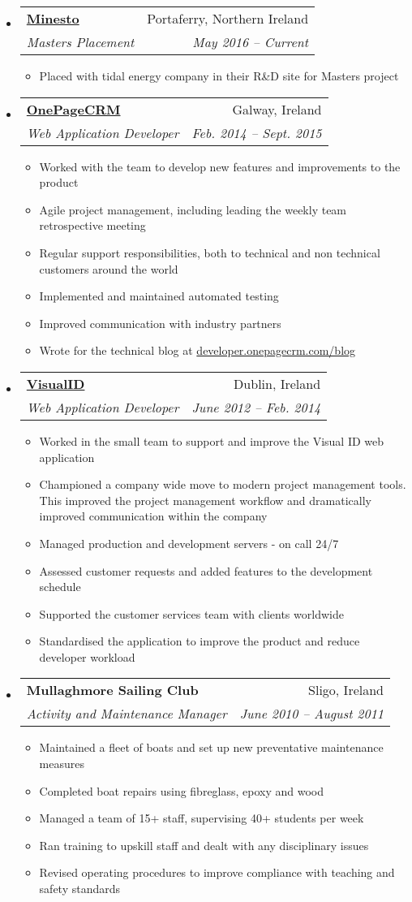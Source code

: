 \documentclass[letterpaper,11pt]{article}
\makeatletter
\newcommand{\resitem}[1]{\item #1 \vspace{-2pt}}
\newcommand{\ressubheading}[4]{
\begin{tabular*}{6.5in}{l@{\extracolsep{\fill}}r}
		\textbf{#1} & #2 \\
		\textit{#3} & \textit{#4} \\
\end{tabular*}\vspace{-6pt}}
\makeatother
\begin{document}
	\begin{itemize}
    \item 
      \ressubheading{\href{http://www.minesto.com}{Minesto}}{Portaferry, Northern Ireland}
        {Masters Placement}{May 2016 -- Current}
        { \footnotesize
        \begin{itemize}
          \resitem{Placed with tidal energy company in their R\&D site for Masters project}
        \end{itemize}
        }

		\item 
			\ressubheading{\href{http://www.onepagecrm.com}{OnePageCRM}}{Galway, Ireland}
				{Web Application Developer}{Feb. 2014 -- Sept. 2015}
				{ 
				\begin{itemize}
					\resitem{Worked with the team to develop new features and improvements to the product}
					\resitem{Agile project management, including leading the weekly team retrospective meeting}
					\resitem{Regular support responsibilities, both to technical and non technical customers around the world}
					\resitem{Implemented and maintained automated testing}
					\resitem{Improved communication with industry partners}
					\resitem{Wrote for the technical blog at \href{http://developer.onepagecrm.com/blog}{developer.onepagecrm.com/blog}}
				\end{itemize}
				}

		  \item 
      \ressubheading{\href{http://visualid.com}{VisualID}}{Dublin, Ireland}{Web Application Developer}{June 2012 -- Feb. 2014}
        { 
        \begin{itemize}
      		\resitem{Worked in the small team to support and improve the Visual ID web application}
      		\resitem{Championed a company wide move to modern project management tools. This improved the project management workflow and dramatically improved communication within the company}
	        \resitem{Managed production and development servers - on call 24/7}
	        \resitem{Assessed customer requests and added features to the development schedule}
	        \resitem{Supported the customer services team with clients worldwide}
	        \resitem{Standardised the application to improve the product and reduce developer workload}
        \end{itemize}
        }
        
        \item
        \ressubheading{Mullaghmore Sailing Club}{Sligo, Ireland}{Activity and Maintenance Manager}{June 2010 -- August 2011}
        {
        \begin{itemize}
        \resitem{Maintained a fleet of boats and set up new preventative maintenance measures}
        \resitem{Completed boat repairs using fibreglass, epoxy and wood}
        \resitem{Managed a team of 15+ staff, supervising 40+ students per week}
        \resitem{Ran training to upskill staff and dealt with any disciplinary issues}
        \resitem{Revised operating procedures to improve compliance with teaching and safety standards}
        \end{itemize}
        }
        

\end{itemize}
\end{document}
